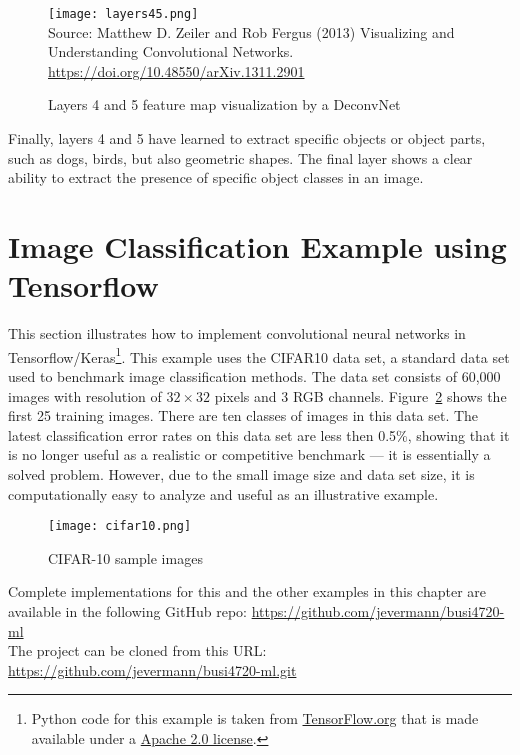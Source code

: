 \begin{figure}
\centering
\texttt{[image: layers45.png]} \\
\vspace{0.5\baselineskip}
\scriptsize Source: Matthew D. Zeiler and Rob Fergus (2013) Visualizing and Understanding Convolutional Networks. \url{https://doi.org/10.48550/arXiv.1311.2901}
\caption{Layers 4 and 5 feature map visualization by a DeconvNet}
\label{fig:layer45}
\end{figure}

Finally, layers 4 and 5 have learned to extract specific objects or object parts, such as dogs, birds, but also geometric shapes. The final layer shows a clear ability to extract the presence of specific object classes in an image. 

\FloatBarrier

\section{Image Classification Example using Tensorflow}

This section illustrates how to implement convolutional neural networks in Tensorflow/Keras\footnote{Python code for this example is taken from \href{https://www.tensorflow.org/tutorials/images/cnn}{TensorFlow.org} that is made available under a \href{https://www.apache.org/licenses/LICENSE-2.0}{Apache 2.0 license}.}. This example uses the CIFAR10 data set, a standard data set used to benchmark image classification methods. The data set consists of 60,000 images with resolution of $32 \times 32$ pixels and 3 RGB channels. Figure~\ref{fig:cifar10sample} shows the first 25 training images. There are ten classes of images in this data set. The latest classification error rates on this data set are less then 0.5\%, showing that it is no longer useful as a realistic or competitive benchmark --- it is essentially a solved problem. However, due to the small image size and data set size, it is computationally easy to analyze and useful as an illustrative example. 

\begin{figure}
\centering
\texttt{[image: cifar10.png]}
\caption{CIFAR-10 sample images}
\label{fig:cifar10sample}
\end{figure}


\begin{resourcebox}
Complete implementations for this and the other examples in this chapter are available in the following GitHub repo:
\small\url{https://github.com/jevermann/busi4720-ml}\normalsize \\

The project can be cloned from this URL: \small\url{https://github.com/jevermann/busi4720-ml.git}\normalsize
\end{resourcebox}


